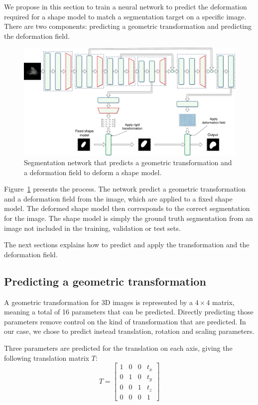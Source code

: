 We propose in this section to train a neural network to predict the deformation required for a shape model to match a segmentation target on a specific image. There are two components: predicting a geometric transformation and predicting the deformation field.

\begin{figure}[htbp]
	\includegraphics[width=\textwidth]{img_seg/deformation_network}
    \caption{Segmentation network that predicts a geometric transformation and a deformation field to deform a shape model.}
    \label{fig:deform_network}
\end{figure}

Figure~\ref{fig:deform_network} presents the process. The network predict a geometric transformation and a deformation field from the image, which are applied to a fixed shape model. The deformed shape model then corresponds to the correct segmentation for the image. The shape model is simply the ground truth segmentation from an image not included in the training, validation or test sets.

The next sections explains how to predict and apply the transformation and the deformation field.

\subsection{Predicting a geometric transformation}

A geometric transformation for 3D images is represented by a $4 \times 4$ matrix, meaning a total of 16 parameters that can be predicted. Directly predicting those parameters remove control on the kind of transformation that are predicted. In our case, we chose to predict instead translation, rotation and scaling parameters. 

Three parameters are predicted for the translation on each axis, giving the following translation matrix $T$:
\begin{equation*}
    T = 
    \begin{bmatrix}
        1 & 0 & 0 & t_x \\
        0 & 1 & 0 & t_y \\
        0 & 0 & 1 & t_z \\ 
        0 & 0 & 0 & 1
    \end{bmatrix}
\end{equation*}

